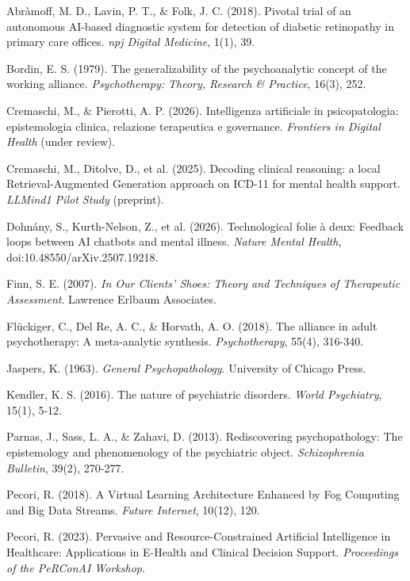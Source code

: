 \documentclass[11pt,a4paper]{article}
\begin{document}
\begin{enumerate}[label={[\arabic*]}]
    \item Abràmoff, M. D., Lavin, P. T., \& Folk, J. C. (2018). Pivotal trial of an autonomous AI-based diagnostic system for detection of diabetic retinopathy in primary care offices. \textit{npj Digital Medicine}, 1(1), 39.
    \item Bordin, E. S. (1979). The generalizability of the psychoanalytic concept of the working alliance. \textit{Psychotherapy: Theory, Research \& Practice}, 16(3), 252.
    \item Cremaschi, M., \& Pierotti, A. P. (2026). Intelligenza artificiale in psicopatologia: epistemologia clinica, relazione terapeutica e governance. \textit{Frontiers in Digital Health} (under review).
    \item Cremaschi, M., Ditolve, D., et al. (2025). Decoding clinical reasoning: a local Retrieval-Augmented Generation approach on ICD-11 for mental health support. \textit{LLMind1 Pilot Study} (preprint).
    \item Dohnány, S., Kurth-Nelson, Z., et al. (2026). Technological folie à deux: Feedback loops between AI chatbots and mental illness. \textit{Nature Mental Health}, doi:10.48550/arXiv.2507.19218.
    \item Finn, S. E. (2007). \textit{In Our Clients' Shoes: Theory and Techniques of Therapeutic Assessment}. Lawrence Erlbaum Associates.
    \item Flückiger, C., Del Re, A. C., \& Horvath, A. O. (2018). The alliance in adult psychotherapy: A meta-analytic synthesis. \textit{Psychotherapy}, 55(4), 316-340.
    \item Jaspers, K. (1963). \textit{General Psychopathology}. University of Chicago Press.
    \item Kendler, K. S. (2016). The nature of psychiatric disorders. \textit{World Psychiatry}, 15(1), 5-12.
    \item Parnas, J., Sass, L. A., \& Zahavi, D. (2013). Rediscovering psychopathology: The epistemology and phenomenology of the psychiatric object. \textit{Schizophrenia Bulletin}, 39(2), 270-277.
    \item Pecori, R. (2018). A Virtual Learning Architecture Enhanced by Fog Computing and Big Data Streams. \textit{Future Internet}, 10(12), 120.
    \item Pecori, R. (2023). Pervasive and Resource-Constrained Artificial Intelligence in Healthcare: Applications in E-Health and Clinical Decision Support. \textit{Proceedings of the PeRConAI Workshop}.

\end{enumerate}
\end{document}
